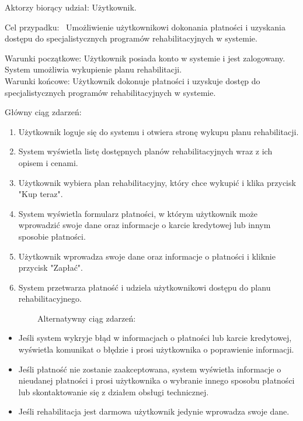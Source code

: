 {Aktorzy biorący udział: Użytkownik.}

{Cel przypadku: ~Umożliwienie użytkownikowi dokonania płatności i
uzyskania dostępu do specjalistycznych programów rehabilitacyjnych w
systemie.}

{Warunki początkowe: Użytkownik posiada konto w systemie i jest
zalogowany. System umożliwia wykupienie planu rehabilitacji.\\
Warunki końcowe: Użytkownik dokonuje płatności i uzyskuje dostęp do
specjalistycznych programów rehabilitacyjnych w systemie.}

{Główny ciąg zdarzeń:}

\begin{enumerate}
\tightlist
\item
  {Użytkownik loguje się do systemu i otwiera stronę wykupu planu
  rehabilitacji.}
\item
  {System wyświetla listę dostępnych planów rehabilitacyjnych wraz z ich
  opisem i cenami.}
\item
  {Użytkownik wybiera plan rehabilitacyjny, który chce wykupić i klika
  przycisk "Kup teraz".}
\item
  {System wyświetla formularz płatności, w którym użytkownik może
  wprowadzić swoje dane oraz informacje o karcie kredytowej lub innym
  sposobie płatności.}
\item
  {Użytkownik wprowadza swoje dane oraz informacje o płatności i kliknie
  przycisk "Zapłać".}
\item
  {System przetwarza płatność i udziela użytkownikowi dostępu do planu
  rehabilitacyjnego.}
\end{enumerate}

{~~~~~~~~Alternatywny ciąg zdarzeń:}

\begin{itemize}
\tightlist
\item
  {Jeśli system wykryje błąd w informacjach o płatności lub karcie
  kredytowej, wyświetla komunikat o błędzie i prosi użytkownika o
  poprawienie informacji.}
\item
  {Jeśli płatność nie zostanie zaakceptowana, system wyświetla
  informacje o nieudanej płatności i prosi użytkownika o wybranie innego
  sposobu płatności lub skontaktowanie się z działem obsługi
  technicznej.}
\item
  {Jeśli rehabilitacja jest darmowa użytkownik jedynie wprowadza swoje
  dane.}
\end{itemize}

{\hfill\break
}


